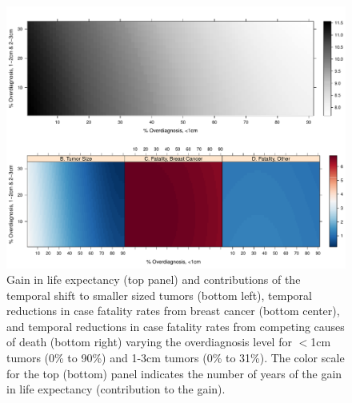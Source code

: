 \documentclass[11pt,letterpaper]{article}
\theoremstyle{plain}
\theoremstyle{remark}
\numberwithin{equation}{section}
\begin{document}
\begin{figure}[h]
\begin{center}
\includegraphics[scale=0.46]{appendix_figure2}
\caption{Gain in life expectancy (top panel) and
  contributions of the temporal shift to smaller sized tumors (bottom
  left), temporal reductions in case fatality rates from breast cancer
  (bottom center), and temporal reductions in case fatality rates from
  competing causes of death (bottom right) varying the overdiagnosis
  level for $<$1cm tumors (0\% to 90\%) and 1-3cm tumors (0\% to
  31\%).  The color scale for the top (bottom) panel indicates the
number of years of the gain in life expectancy (contribution to the gain).}
\label{fig:figure2}
\end{center}
\end{figure}

\newpage
\newpage
\end{document}
